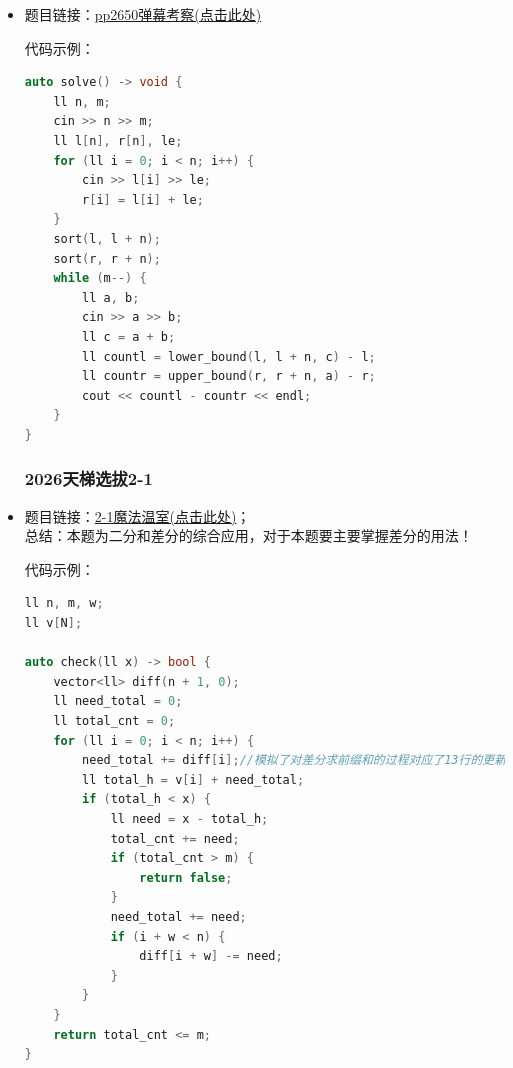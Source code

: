 \begin{itemize}
代码示例：\\
\begin{lstlisting}[language=C++]
ll n, m, c;
vector<ll> v;

auto check(const ll x) -> bool {
	ll ans = 1;
	ll start_id = 0;
	for (ll i = 1; i < n; i++) {
		if (v[i] - v[start_id] > x || i - start_id + 1 > c) {
			ans++;
			start_id = i;
		}
	}
	return ans <= m;
}

auto solve() -> void {
	cin >> n >> m >> c;
	for (ll i = 0; i < n; i++) {
		ll num;
		cin >> num;
		v.emplace_back(num);
	}
	sort(v.begin(), v.end());
	ll l = 0, r = v[n - 1] - v[0] + 1;
	while (l + 1 < r) {
		ll mid = l + ((r - l) >> 1);
		if (check(mid)) {
			r = mid;
		} else {
			l = mid;
		}
	}
	cout << r << endl;
}
\end{lstlisting}
\textcolor{red}{总结：在解决最大的最小值或最小的最大值时，往往要求的东西为二分对象，同时也是check函数里面的比较对象；}
\subsubsection{P2650弹幕考察}
\item 题目链接：\href{https://www.luogu.com.cn/problem/P2650}{pp2650弹幕考察(点击此处)}

代码示例：\\
\begin{lstlisting}[language=C++]
auto solve() -> void {
	ll n, m;
	cin >> n >> m;
	ll l[n], r[n], le;
	for (ll i = 0; i < n; i++) {
		cin >> l[i] >> le;
		r[i] = l[i] + le;
	}
	sort(l, l + n);
	sort(r, r + n);
	while (m--) {
		ll a, b;
		cin >> a >> b;
		ll c = a + b;
		ll countl = lower_bound(l, l + n, c) - l;
		ll countr = upper_bound(r, r + n, a) - r;
		cout << countl - countr << endl;
	}
}
\end{lstlisting}
\subsubsection{2026天梯选拔2-1}
\item 题目链接：\href{https://pintia.cn/problem-sets/2030339464381566976/exam/problems/type/7?problemSetProblemId=2030339464444481544}{2-1魔法温室(点击此处)}；\\总结：本题为二分和差分的综合应用，对于本题要主要掌握差分的用法！

代码示例：\\
\begin{lstlisting}[language=C++]
ll n, m, w;
ll v[N];

auto check(ll x) -> bool {
	vector<ll> diff(n + 1, 0);
	ll need_total = 0;
	ll total_cnt = 0;
	for (ll i = 0; i < n; i++) {
		need_total += diff[i];//模拟了对差分求前缀和的过程对应了13行的更新
		ll total_h = v[i] + need_total;
		if (total_h < x) {
			ll need = x - total_h;
			total_cnt += need;
			if (total_cnt > m) {
				return false;
			}
			need_total += need;
			if (i + w < n) {
				diff[i + w] -= need;
			}
		}
	}
	return total_cnt <= m;
}


\end{lstlisting}
\end{itemize}
